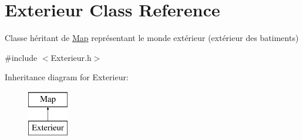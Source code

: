 \hypertarget{classExterieur}{\section{Exterieur Class Reference}
\label{classExterieur}
}


Classe héritant de \hyperlink{classMap}{Map} représentant le monde extérieur (extérieur des batiments)  




{\ttfamily \#include $<$Exterieur.\-h$>$}

Inheritance diagram for Exterieur\-:\begin{figure}[H]
\begin{center}
\leavevmode
\includegraphics[height=2.000000cm]{classExterieur}
\end{center}
\end{figure}
